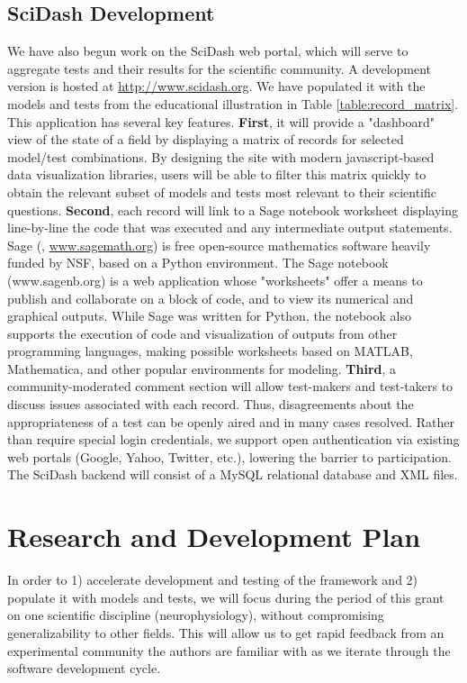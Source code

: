 \documentclass[11pt,letterpaper]{article}
\begin{document}
\subsection{SciDash Development}
We have also begun work on the SciDash web portal, which will serve to aggregate tests and their results for the scientific community. A development version is hosted at \url{http://www.scidash.org}.  We have populated it with the models and tests from the educational illustration in Table \ref{table:record_matrix}.  This application has several key features.  \textbf{First}, it will provide a "dashboard" view of the state of a field by displaying a matrix of records for selected model/test combinations.  By designing the site with modern javascript-based data visualization libraries, users will be able to filter this matrix quickly to obtain the relevant subset of models and tests most relevant to their scientific questions.  \textbf{Second}, each record will link to a Sage notebook worksheet displaying line-by-line the code that was executed and any intermediate output statements.  Sage (\cite{stein_sage:_2005}, \url{www.sagemath.org}) is free open-source mathematics software heavily funded by NSF, based on a Python environment.  The Sage notebook (www.sagenb.org) is a web application whose "worksheets" offer a means to publish and collaborate on a block of code, and to view its numerical and graphical outputs.  While Sage was written for Python, the notebook also supports the execution of code and visualization of outputs from other programming languages, making possible worksheets based on MATLAB, Mathematica, and other popular environments for modeling.  \textbf{Third}, a community-moderated comment section will allow test-makers and test-takers to discuss issues associated with each record.  Thus, disagreements about the appropriateness of a test can be openly aired and in many cases resolved.  Rather than require special login credentials, we support open authentication via existing web portals (Google, Yahoo, Twitter, etc.), lowering the barrier to participation.  The SciDash backend will consist of a MySQL relational database and XML files.  

\section{Research and Development Plan}
In order to 1) accelerate development and testing of the framework and 2) populate it with models and tests, we will focus during the period of this grant on one scientific discipline (neurophysiology), without compromising generalizability to other fields. This will allow us to get rapid feedback from an experimental community the authors are familiar with as we iterate through the software development cycle.  
\end{document}
